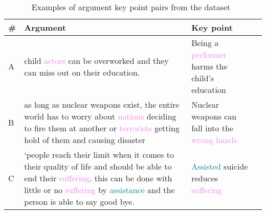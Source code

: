 \begin{table*}
    \caption{Examples of argument key point pairs from the \ArgKP dataset~\cite{Bar-HaimEFKLS2020}}
    \label{examples}
    \begin{tabularx}{\linewidth}{lXp{4.3cm}c}
      \toprule
      \textbf{\#} & \textbf{Argument} & \textbf{Key point} \\
      \midrule
      A & %
      child \textcolor{violet}{actors} can be overworked and they can miss out on their education. & %
      Being a \textcolor{violet}{performer} harms the child's education \\ %
      B & %
      as long as nuclear weapons exist, the entire world has to worry about \textcolor{violet}{nations} deciding to fire them at another or \textcolor{violet}{terrorists} getting hold of them and causing disaster & %
      Nuclear weapons can fall into the \textcolor{violet}{wrong hands} \\ %
      C & %
      `people reach their limit when it comes to their quality of life and should be able to end their \textcolor{violet}{suffering}. this can be done with little or no \textcolor{violet}{suffering} by \textcolor{teal}{assistance} and the person is able to say good bye. & %
      \textcolor{teal}{Assisted} suicide reduces \textcolor{violet}{suffering} \\ %
      \bottomrule
    \end{tabularx}
  \end{table*}
